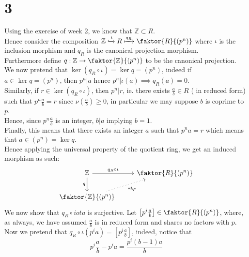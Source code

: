 \documentclass[11pt, a4paper]{article}
\begin{document}
\section*{3}
Using the exercise of week 2, we know that $ \mathbb{Z} \subset R$.\\
Hence consider the composition $ \mathbb{Z} \xhookrightarrow{\iota} R \xmapsto{q_R} \faktor { R} { ( p^{n}) } $ where $\iota$ is the inclusion morphism and $q_R$ is the canonical projection morphism.\\
Furthermore define $ q: \mathbb{Z}\to \faktor { \mathbb{Z}} { ( p^{n}) } $ to be the canonical projection.\\
We now pretend that $\ker ( q_R\circ \iota) = \ker q = ( p^{n}) $, indeed if $ a \in \ker q = ( p^{n}) $, then $p^{n}| a$ hence $p^{n}| \iota( a) \implies q_R( a) = 0$.\\
Similarly, if $ r\in \ker( q_R\circ \iota) $, then $p^{n}| r$, ie. there exists $ \frac{a}{b}\in R$ ( in reduced form)  such that
$p^{n}\frac{a}{b} = r$ since $\nu( \frac{a}{b}) \geq 0$, in particular we may suppose $b$ is coprime to $p$.\\
Hence, since $p^{n} \frac{a}{b}$ is an integer, $b| a$ implying $b=1$.\\
Finally, this means that there exists an integer $a$ such that $p^{n} a = r$ which means that $a\in ( p^{n}) = \ker q$.\\
Hence applying the universal property of the quotient ring, we get an induced morphism as such:
\[\begin{tikzcd}
	{\mathbb{Z}} & {\faktor{R}{(p^n)}} \\
	{\faktor{\mathbb{Z}}{(p^n)}}
	\arrow["{q_R\circ\iota}", from=1-1, to=1-2]
	\arrow["q"', from=1-1, to=2-1]
	\arrow["{\exists !\varphi}"', dotted, from=2-1, to=1-2]
\end{tikzcd}\]
We now show that $q_R \circ iota$ is surjective.
Let $ \left[ p^{i}\frac{a}{b} \right]\in \faktor { R} { ( p^{n}) }  $, where, as always, we have assumed $\frac{a}{b}$ is in reduced form and shares no factors with $p$.\\
Now we pretend that $q_R\circ \iota ( p^{i} a) = [ p^{i} \frac{a}{b}] $, indeed, notice that 
\[ 
p^{i}\frac{a}{b} - p^{i}a = \frac{p^{i}( b-1) a}{b}
\]
\end{document}
